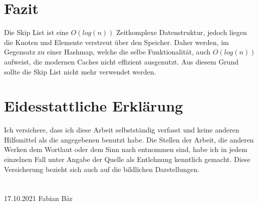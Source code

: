 \documentclass{TUBAFarbeiten}
\begin{document}
\section{Fazit}
Die Skip List ist eine \(O(log(n))\) Zeitkomplexe Datenstruktur, jedoch liegen die Knoten und Elemente verstreut über den Speicher. Daher werden, im Gegensatz zu einer Hashmap, welche die selbe Funktionalität, auch \(O(log(n))\) aufweist, die modernen Caches nicht effizient ausgenutzt. Aus diesem Grund sollte die Skip List nicht mehr verwendet werden.




\newpage
\section{Eidesstattliche Erklärung}
Ich versichere, dass ich diese Arbeit selbstständig verfasst und keine anderen Hilfsmittel als
die angegebenen benutzt habe. Die Stellen der Arbeit, die anderen Werken dem Wortlaut oder
dem Sinn nach entnommen sind, habe ich in jedem einzelnen Fall unter Angabe der Quelle
als Entlehnung kenntlich gemacht. Diese Versicherung bezieht sich auch auf die bildlichen
Darstellungen.\\ \\ \\

17.10.2021 \hfill Fabian Bär

\end{document}

